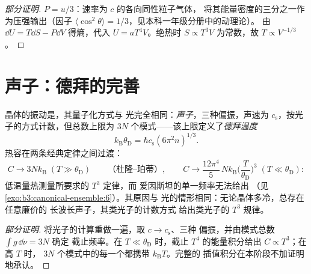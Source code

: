 \begin{proof}[部分证明]
$P = u/3$：速率为 $c$ 的各向同性粒子气体，
将其能量密度的三分之一作为压强输出（因子 $\langle
\cos^2\theta\rangle = 1/3$，见本科一年级分册中的动理论）。
由 $\dd U = T\dd S - P\dd V$ 得熵，代入 $U =
aT^4V$。绝热时 $S \propto T^3V$ 为常数，故 $T \propto
V^{-1/3}$。
\end{proof}

\section{声子：德拜的完善}

\begin{theorem}[德拜模型]\label{thm:b3:photons-phonons:debye}
晶体的振动是，其量子化方式与
光完全相同：\emph{声子}，三种偏振，声速为
$c_{\text{s}}$，按光子的方式计数，但总数上限为
$3N$ 个模式——该上限定义了\emph{德拜温度}
\[
k_{\text{B}}\theta_{\text{D}} = \hbar c_{\text{s}}
(6\pi^2n)^{1/3} .
\]
热容在两条经典定律之间过渡：
\[
C \to 3Nk_{\text{B}} \;(T \gg \theta_{\text{D}})
\qquad\text{（杜隆–珀蒂）} ,
\qquad
C \to \frac{12\pi^4}{5}\,Nk_{\text{B}}
\Big(\frac{T}{\theta_{\text{D}}}\Big)^3
\;(T \ll \theta_{\text{D}}) :
\]
低温量热测量所要求的 $T^3$ 定律，而
爱因斯坦的单一频率无法给出
（见\cref{exo:b3:canonical-ensemble:6}）。其原因与
光的情形相同：无论晶体多冷，总存在任意廉价的
长波长声子，其类光子的计数方式
给出类光子的 $T^3$ 规律。
\end{theorem}

\begin{proof}[部分证明]
将光子的计算重做一遍，取 $c \to c_{\text{s}}$、三种
偏振，并由模式总数 $\int g\,\dd\nu = 3N$ 确定
截止频率。在 $T \ll \theta_{\text{D}}$ 时，截止
$T^4$ 的能量积分给出 $C \propto T^3$；在高 $T$ 时，
$3N$ 个模式中的每一个都携带 $k_{\text{B}}T$。完整的
插值积分在本阶段不加证明地承认。
\end{proof}

